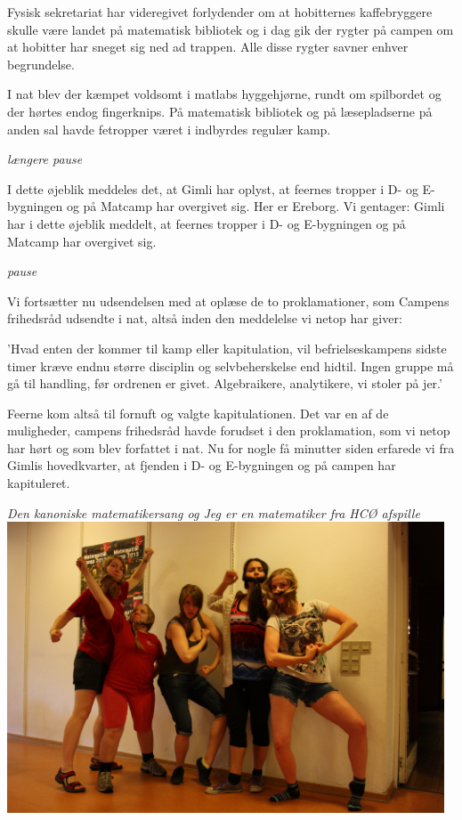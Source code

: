 \begin{minipage}[t]{170mm}
\begin{center}
Fysisk sekretariat har videregivet forlydender om at hobitternes kaffebryggere skulle være landet på matematisk bibliotek og i dag gik der rygter på campen om at hobitter har sneget sig ned ad trappen. Alle disse rygter savner enhver begrundelse.

I nat blev der kæmpet voldsomt i matlabs hyggehjørne, rundt om spilbordet og der hørtes endog fingerknips. På matematisk bibliotek og på læsepladserne på anden sal havde fetropper været i indbyrdes regulær kamp.

\emph{længere pause}

I dette øjeblik meddeles det, at Gimli har oplyst, at feernes tropper i D- og E-bygningen og på Matcamp har overgivet sig. Her er Ereborg. Vi gentager: Gimli har i dette øjeblik meddelt, at feernes tropper i D- og E-bygningen og på Matcamp har overgivet sig.

\emph{pause}

Vi fortsætter nu udsendelsen med at oplæse de to proklamationer, som Campens frihedsråd udsendte i nat, altså inden den meddelelse vi netop har giver:

'Hvad enten der kommer til kamp eller kapitulation, vil befrielseskampens sidste timer kræve endnu større disciplin og selvbeherskelse end hidtil. Ingen gruppe må gå til handling, før ordrenen er givet. Algebraikere, analytikere, vi stoler på jer.'

Feerne kom altså til fornuft og valgte kapitulationen. Det var en af de muligheder, campens frihedsråd havde forudset i den proklamation, som vi netop har hørt og som blev forfattet i nat. Nu for nogle få minutter siden erfarede vi fra Gimlis hovedkvarter, at fjenden i D- og E-bygningen og på campen har kapituleret.

\emph{Den kanoniske matematikersang og Jeg er en matematiker fra HCØ afspille}
\vspace{3mm}
\includegraphics[width=130mm]{dvaergetropper.jpg}
\end{center}
\end{minipage}
